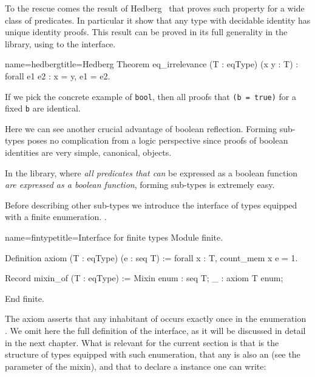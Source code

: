 To the rescue comes the result of Hedberg~\cite{Hedberg}
that proves such property for a wide class of predicates.
In particular it show that any type with decidable identity
has unique identity proofs. This result can be proved in its full generality
in the \mcbMC{} library, using to the  interface.

\begin{coq}{name=hedberg}{title=Hedberg}
Theorem eq_irrelevance (T : eqType) (x y : T) : forall e1 e2 : x = y, e1 = e2.
\end{coq}

If we pick the concrete example of \lstinline/bool/,
then all proofs that \lstinline/(b = true)/
for a fixed \lstinline/b/ are identical.

Here we can see another crucial advantage of boolean reflection.
Forming sub-types poses no complication from a logic perspective since
proofs of boolean identities are very simple, canonical, objects.

In the \mcbMC{} library, where \emph{all predicates that can} be
expressed as a boolean function \emph{are expressed as a boolean
function}, forming sub-types is extremely easy.


\mcbLEARN{}
\mcbNOTES{}

Before describing other sub-types we introduce the interface of
types equipped with a finite enumeration.  .

\begin{coq}{name=fintype}{title=Interface for finite types}
Module finite.

Definition axiom (T : eqType) (e : seq T) :=
  forall x : T, count_mem x e = 1.

Record mixin_of (T : eqType) := Mixin {
  enum : seq T;
  _ : axiom T enum;
}

End finite.
\end{coq}

The axiom asserts that any inhabitant of  occurs exactly once
in the enumeration .  We omit here the full definition of the
interface, as it will be discussed in detail in the next chapter.
What is relevant for the current section is that  is the
structure of types equipped with such enumeration, that any 
is also an  (see the parameter of the mixin), and that
to declare a  instance one can write:

